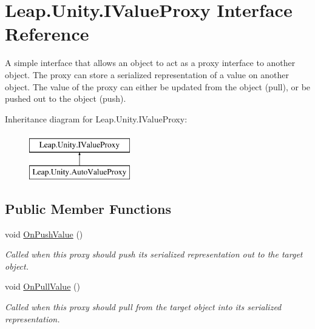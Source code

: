 \hypertarget{interface_leap_1_1_unity_1_1_i_value_proxy}{}\section{Leap.\+Unity.\+I\+Value\+Proxy Interface Reference}
\label{interface_leap_1_1_unity_1_1_i_value_proxy}


A simple interface that allows an object to act as a \textquotesingle{}proxy\textquotesingle{} interface to another object. The proxy can store a serialized representation of a value on another object. The value of the proxy can either be updated from the object (pull), or be pushed out to the object (push).  


Inheritance diagram for Leap.\+Unity.\+I\+Value\+Proxy\+:\begin{figure}[H]
\begin{center}
\leavevmode
\includegraphics[height=2.000000cm]{interface_leap_1_1_unity_1_1_i_value_proxy}
\end{center}
\end{figure}
\subsection*{Public Member Functions}
\begin{DoxyCompactItemize}
\item 
void \mbox{\hyperlink{interface_leap_1_1_unity_1_1_i_value_proxy_ae15d0179600a616ef6bdc8e1a9e2566c}{On\+Push\+Value}} ()
\begin{DoxyCompactList}\small\item\em Called when this proxy should push its serialized representation out to the target object. \end{DoxyCompactList}\item 
void \mbox{\hyperlink{interface_leap_1_1_unity_1_1_i_value_proxy_a7f9d6fc629e00aa51cca2a3c39c8b097}{On\+Pull\+Value}} ()
\begin{DoxyCompactList}\small\item\em Called when this proxy should pull from the target object into its serialized representation. \end{DoxyCompactList}\end{DoxyCompactItemize}


